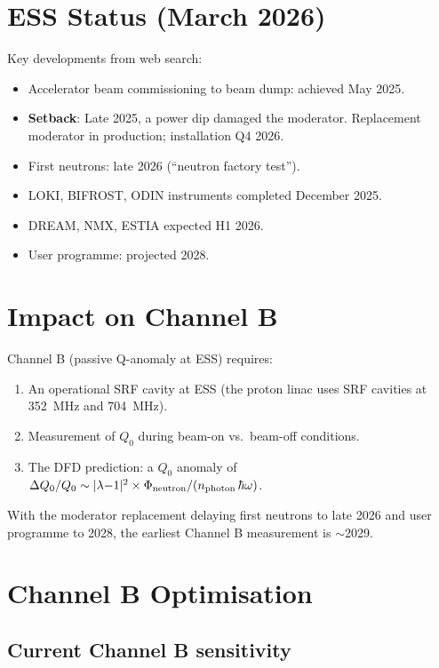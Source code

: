 \documentclass[11pt]{article}
\newcommand{\lambdaone}{|\lambda{-}1|}
\begin{document}
\section{ESS Status (March 2026)}

Key developments from web search:
\begin{itemize}[nosep]
\item Accelerator beam commissioning to beam dump: achieved May 2025.
\item \textbf{Setback}: Late 2025, a power dip damaged the moderator.
  Replacement moderator in production; installation Q4 2026.
\item First neutrons: late 2026 (``neutron factory test'').
\item LOKI, BIFROST, ODIN instruments completed December 2025.
\item DREAM, NMX, ESTIA expected H1 2026.
\item User programme: projected 2028.
\end{itemize}

\section{Impact on Channel B}

Channel B (passive Q-anomaly at ESS) requires:
\begin{enumerate}[nosep]
\item An operational SRF cavity at ESS (the proton linac uses SRF
  cavities at 352~MHz and 704~MHz).
\item Measurement of $Q_0$ during beam-on vs.\ beam-off conditions.
\item The DFD prediction: a $Q_0$ anomaly of
  $\Delta Q_0/Q_0 \sim \lambdaone^2 \times \Phi_{\rm neutron}/(n_{\rm
  photon}\,\hbar\omega)$.
\end{enumerate}

With the moderator replacement delaying first neutrons to late 2026
and user programme to 2028, the earliest Channel B measurement is
$\sim$2029.

\section{Channel B Optimisation}

\subsection{Current Channel B sensitivity}
\end{document}
